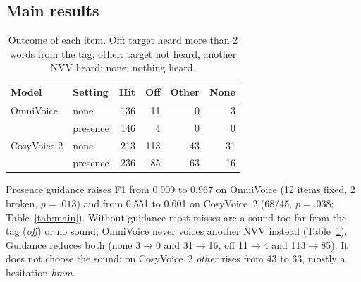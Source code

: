 \documentclass[11pt]{article}
\begin{document}
\begin{table}[t]
  \centering
  \small
  \setlength{\tabcolsep}{4pt}
  \caption{NVV-SuperBench, English tag-based part (OmniVoice 150 items, CosyVoice~2 400); one run of the substitute judge. Fix/brk: items hit with the setting and missed without guidance, and the reverse; $p$: exact two-sided sign test.}
  \label{tab:main}
\end{table}

\subsection{Main results}

\begin{table}[t]
  \centering
  \small
  \begin{tabular}{llrrrr}
    \toprule
    Model & Setting & Hit & Off & Other & None \\
    \midrule
    OmniVoice   & none     & 136 & 11 & 0 & 3 \\
                & presence & 146 & 4  & 0 & 0 \\
    CosyVoice 2 & none     & 213 & 113 & 43 & 31 \\
                & presence & 236 & 85  & 63 & 16 \\
    \bottomrule
  \end{tabular}
  \caption{Outcome of each item. Off: target heard more than 2 words from the tag; other: target not heard, another NVV heard; none: nothing heard.}
  \label{tab:outcomes}
\end{table}

Presence guidance raises F1 from 0.909 to 0.967 on OmniVoice (12 items fixed, 2 broken, $p = .013$) and from 0.551 to 0.601 on CosyVoice~2 (68/45, $p = .038$; Table~\ref{tab:main}). Without guidance most misses are a sound too far from the tag (\emph{off}) or no sound; OmniVoice never voices another NVV instead (Table~\ref{tab:outcomes}). Guidance reduces both (none 3$\to$0 and 31$\to$16, off 11$\to$4 and 113$\to$85). It does not choose the sound: on CosyVoice~2 \emph{other} rises from 43 to 63, mostly a hesitation \emph{hmm}.
\end{document}

